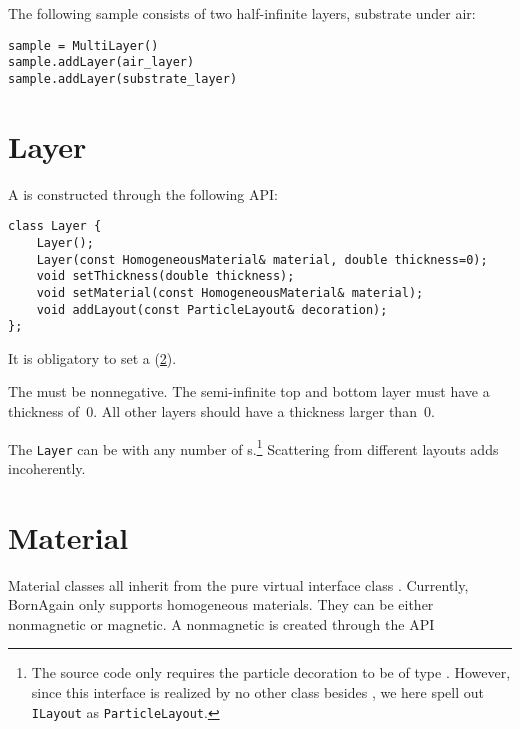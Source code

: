 The following sample consists of two half-infinite layers,
substrate under air:

\setPy
\begin{lstlisting}
sample = MultiLayer()
sample.addLayer(air_layer)
sample.addLayer(substrate_layer)
\end{lstlisting}

\section{Layer}\label{SRefLayer}

A  is constructed through the following API:

\setCpp
\begin{lstlisting}
class Layer {
    Layer();
    Layer(const HomogeneousMaterial& material, double thickness=0);
    void setThickness(double thickness);
    void setMaterial(const HomogeneousMaterial& material);
    void addLayout(const ParticleLayout& decoration);
};
\end{lstlisting}

It is obligatory to set a  (\cref{SRefMat}).

The  must be nonnegative.
The semi-infinite top and bottom layer must have a  thickness of~0.
All other layers should have a thickness larger than~0.

The \texttt{Layer} can be  with any number of s.\footnote
{The source code only requires the particle decoration to be of type .
However, since this interface is realized by no other class besides ,
we here spell out \texttt{ILayout} as \texttt{ParticleLayout}.}
Scattering from different layouts adds incoherently.

\section{Material}\label{SRefMat}

Material classes all inherit from the pure virtual interface class .
Currently, BornAgain only supports homogeneous materials.
They can be either nonmagnetic or magnetic.
A nonmagnetic  is created through the API

